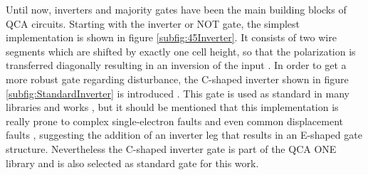 Until now, inverters and majority gates have been the main building blocks of QCA circuits. Starting with the inverter or NOT gate, the simplest implementation is shown in figure \ref{subfig:45Inverter}. It consists of two wire segments which are shifted by exactly one cell height, so that the polarization is transferred diagonally resulting in an inversion of the input \cite{Sasamal2020QuantumDotCA}. In order to get a more robust gate regarding disturbance, the C-shaped inverter shown in figure \ref{subfig:StandardInverter} is introduced \cite{QCA_scl}. This gate is used as standard in many libraries and works \cite{peng2020spars, greedy_tile, sequential_cell_one, USE}, but it should be mentioned that this implementation is really prone to complex single-electron faults \cite{SingelElectronFaults} and even common displacement faults \cite{Inverter_displacements}, suggesting the addition of an inverter leg that results in an E-shaped gate structure. Nevertheless the C-shaped inverter gate is part of the QCA ONE library and is also selected as standard gate for this work.\\
